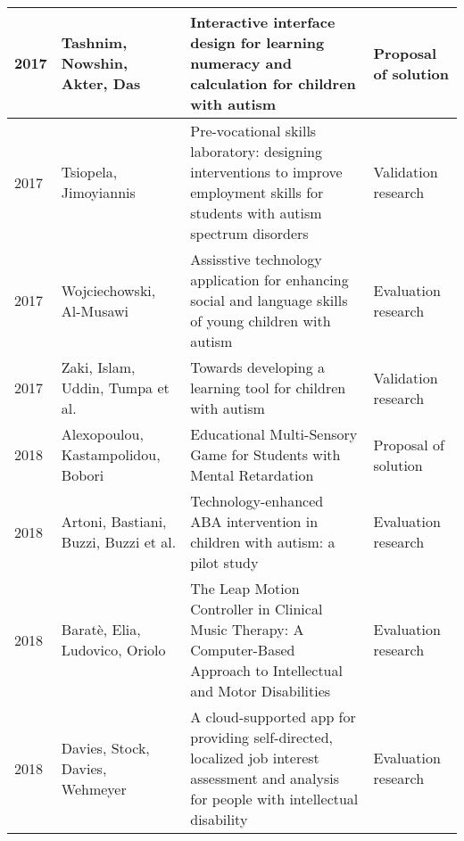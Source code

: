 \documentclass[utf8,english]{gradu3}
\begin{document}
\begin{longtable}{|>{\scriptsize}l|>{\scriptsize}p{3cm}|>{\scriptsize}p{8cm}|>{\scriptsize}p{2.4cm}|}
  2017          & Tashnim, Nowshin, Akter, Das                                         & Interactive interface design for learning numeracy and calculation for children with autism                                                                                                  & Proposal of solution       \\ \hline
  2017          & Tsiopela, Jimoyiannis                                                & Pre-vocational skills laboratory: designing interventions to improve employment skills for students with autism spectrum disorders                                                           & Validation research        \\ \hline
  2017          & Wojciechowski, Al-Musawi                                             & Assisstive technology application for enhancing social and language skills of young children with autism                                                                                     & Evaluation research        \\ \hline
  2017          & Zaki, Islam, Uddin, Tumpa et al.                                     & Towards developing a learning tool for children with autism                                                                                                                                  & Validation research        \\ \hline
  2018          & Alexopoulou, Kastampolidou, Bobori                                   & Educational Multi-Sensory Game for Students with Mental Retardation                                                                                                                          & Proposal of solution       \\ \hline
  2018          & Artoni, Bastiani, Buzzi, Buzzi et al.                                & Technology-enhanced ABA intervention in children with autism: a pilot study                                                                                                                  & Evaluation research        \\ \hline
  2018          & Baratè, Elia, Ludovico, Oriolo                                       & The Leap Motion Controller in Clinical Music Therapy: A Computer-Based Approach to Intellectual and Motor Disabilities                                                                       & Evaluation research        \\ \hline
  2018          & Davies, Stock, Davies, Wehmeyer                                      & A cloud-supported app for providing self-directed, localized job interest assessment and analysis for people with intellectual disability                                                    & Evaluation research        \\ \hline

\end{longtable}
\end{document}
